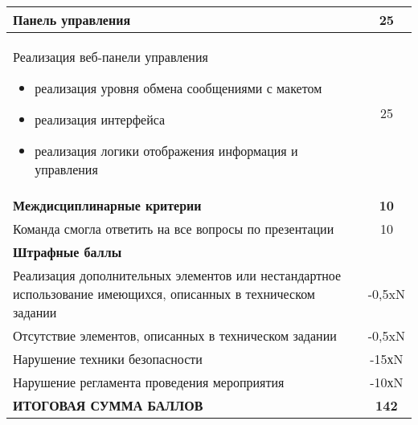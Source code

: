 \begin{table}[H]
    \begin{tabular}{|p{14cm}|c|}
        \hline
        \textbf{Панель управления} & \textbf{25}  \\
        \hline
        Реализация веб-панели управления 
        \begin{itemize}
            \item реализация уровня обмена сообщениями с макетом 
            \item реализация интерфейса 
            \item реализация логики отображения информация и управления            
        \end{itemize} & 25 \\
        \hline
        \hline
        \textbf{ Междисциплинарные критерии} & \textbf{10}  \\
        \hline
        Команда смогла ответить на все вопросы по презентации & 10 \\
        \hline
        \hline
        \textbf{Штрафные баллы}	 & \\
        \hline
        Реализация дополнительных элементов или нестандартное использование имеющихся, описанных в техническом задании & -0,5xN \\
        \hline
        Отсутствие элементов, описанных в техническом задании & -0,5xN \\
        \hline
        Нарушение техники безопасности & -15хN \\
        \hline
        Нарушение регламента проведения мероприятия & -10хN \\
        \hline
        \hline
        \textbf{ИТОГОВАЯ СУММА БАЛЛОВ} & \textbf{142} \\
        \hline
    \end{tabular}
    
\end{table}
